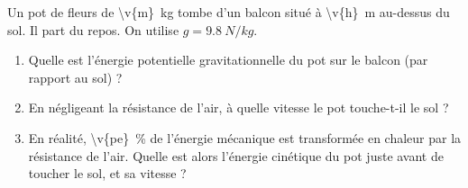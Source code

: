 Un pot de fleurs de \qty{\v{m}}{kg} tombe d'un balcon situé à \qty{\v{h}}{m} au-dessus du sol. Il part du repos. On utilise $g = \qty{9.8}{N/kg}$.

\begin{enumerate}[label=\alph*)]
    \item Quelle est l'énergie potentielle gravitationnelle du pot sur le balcon (par rapport au sol) ?
    \item En négligeant la résistance de l'air, à quelle vitesse le pot touche-t-il le sol ?
    \item En réalité, \qty{\v{pe}}{\percent} de l'énergie mécanique est transformée en chaleur par la résistance de l'air. Quelle est alors l'énergie cinétique du pot juste avant de toucher le sol, et sa vitesse ?
\end{enumerate}
